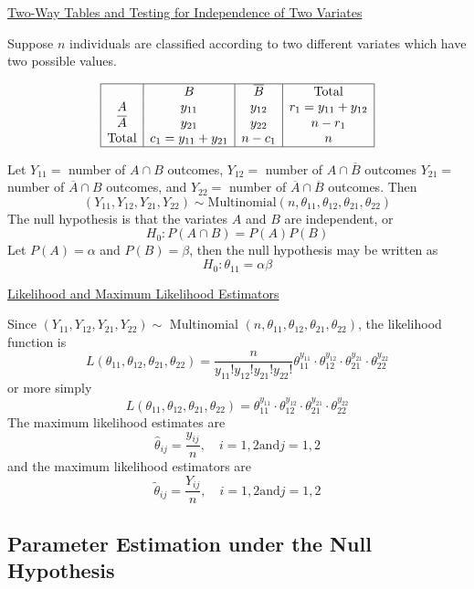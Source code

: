 \underline{Two-Way Tables and Testing for Independence of Two Variates}

Suppose $ n $ individuals are classified according to two different variates which have two possible values.

\[ \begin{array}{|c|c|c|c|}
        \hline       & B                   & \overline{B} & \text{Total}        \\
        A            & y_{11}              & y_{12}       & r_{1}=y_{11}+y_{12} \\
        \overline{A} & y_{21}              & y_{22}       & n-r_{1}             \\
        \text{Total} & c_{1}=y_{11}+y_{21} & n-c_{1}      & n                   \\
        \hline
    \end{array} \]

Let $Y_{11}=$ number of $A \cap B$ outcomes, $Y_{12}=$ number of $A \cap \overline{B}$ outcomes $Y_{21}=$ number of $\overline{A} \cap B$ outcomes, and $Y_{22}=$ number of $\overline{A} \cap \overline{B}$ outcomes.
Then
\[
    \left(Y_{11}, Y_{12}, Y_{21}, Y_{22}\right) \sim \text{Multinomial}\left(n, \theta_{11}, \theta_{12}, \theta_{21}, \theta_{22}\right)
\]
The null hypothesis is that the variates $A$ and $B$ are independent, or
\[
    H_{0}: P(A \cap B)=P(A) P(B)
\]
Let $P(A)=\alpha$ and $P(B)=\beta$, then the null hypothesis may be written as
\[
    H_{0}: \theta_{11}=\alpha \beta
\]

\underline{Likelihood and Maximum Likelihood Estimators}

Since $\left(Y_{11}, Y_{12}, Y_{21}, Y_{22}\right) \sim$ Multinomial $\left(n, \theta_{11}, \theta_{12}, \theta_{21}, \theta_{22}\right)$, the likelihood function is
\[
    L\left(\theta_{11}, \theta_{12}, \theta_{21}, \theta_{22}\right)=\frac{n}{y_{11} ! y_{12} ! y_{21} ! y_{22} !} \theta_{11}^{y_{11}} \cdot \theta_{12}^{y_{12}} \cdot \theta_{21}^{y_{21}} \cdot \theta_{22}^{y_{22}}
\]
or more simply
\[
    L\left(\theta_{11}, \theta_{12}, \theta_{21}, \theta_{22}\right)=\theta_{11}^{y_{11}} \cdot \theta_{12}^{y_{12}} \cdot \theta_{21}^{y_{21}} \cdot \theta_{22}^{y_{22}}
\]
The maximum likelihood estimates are
\[
    \hat{\theta}_{i j}=\frac{y_{i j}}{n}, \quad i=1,2 \text{and} j=1,2
\]
and the maximum likelihood estimators are
\[
    \tilde{\theta}_{i j}=\frac{Y_{i j}}{n}, \quad i=1,2 \text{and} j=1,2
\]

\subsection{Parameter Estimation under the Null Hypothesis}

